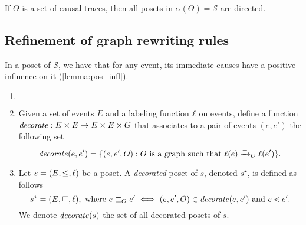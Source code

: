 \begin{property}
  If $\Theta$ is a set of causal traces, then all posets in $\alpha(\Theta)=\mathcal{S}$ are directed.
\end{property}




\subsection{Refinement of graph rewriting rules}

In a poset of $\mathcal{S}$, we have that for any event, its immediate causes have a positive influence on it (\autoref{lemma:pos_infl}).

\begin{definition}
  \begin{enumerate}
  \item[] $~$
  \item Given a set of events $E$ and a labeling function $\ell$ on events, define a function $\mathit{decorate}:E\times E \to E\times E\times G$ that associates to a pair of events $(e,e')$ the following set
    \[
    \mathit{decorate}(e,e') = \{(e,e',O) : O\text{ is a graph such that }\ell(e)\mathrel{\xrightarrow{+}}_O \ell(e')\}.
    \]

  \item Let $s = (E,\leq,\ell)$ be a poset. A \emph{decorated} poset of $s$, denoted $s^{\star}$, is defined as follows
    \[
    s^{\star} = (E,\sqsubseteq,\ell), \text{ where }e\sqsubset_O e' \iff (e,e',O)\in\mathit{decorate}(e,e')\text{ and }e\lessdot e'.
    \]
    We denote $\mathit{decorate}(s)$ the set of all decorated posets of $s$.
  \end{enumerate}
\end{definition}

